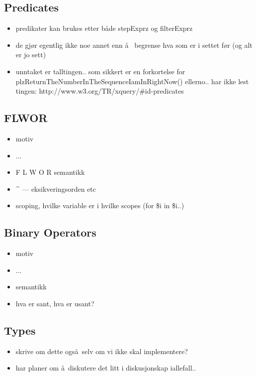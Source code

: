 \subsection{Predicates}
\label{sect:theory:xqueryPredicates}
\begin{itemize}
  \item predikater kan brukes etter b\aa de stepExprz og filterExprz
  \item de gj\o r egentlig ikke noe annet enn \aa~ begrense hva som er i settet
  f\o r (og alt er jo sett)
  \item unntaket er talltingen.. som sikkert er en forkortelse for
  plzReturnTheNumberInTheSequenceIamInRightNow() ellerno.. har ikke lest
  tingen: http://www.w3.org/TR/xquery/\#id-predicates
\end{itemize}

\subsection{FLWOR}
\label{sect:theory:flwor}

\begin{itemize}
\item motiv
\item ...
\item F L W O R semantikk
\item \^{} --- eksikveringsorden etc
\item scoping, hvilke variable er i hvilke scopes (for \$i in \$i..)
\end{itemize}

\subsection{Binary Operators}

\begin{itemize}
\item motiv
\item ...
\item semantikk
\item hva er sant, hva er usant?
\end{itemize}

\subsection{Types}
\begin{itemize}
  \item skrive om dette ogs\aa~selv om vi ikke skal implementere?
  \item har planer om \aa~diskutere det litt i diskusjonskap iallefall..
\end{itemize}

